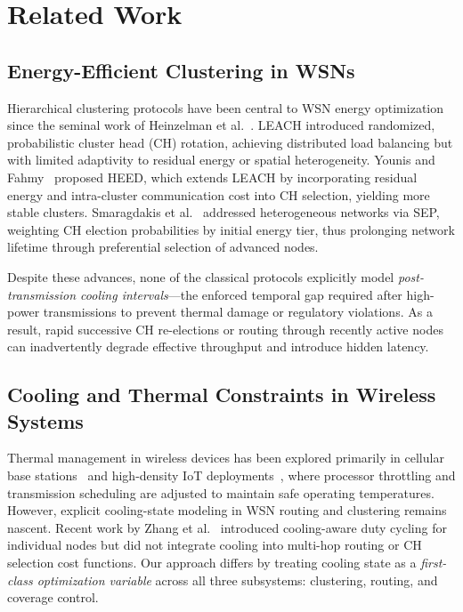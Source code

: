 \section{Related Work}

\subsection{Energy-Efficient Clustering in WSNs}
Hierarchical clustering protocols have been central to WSN energy optimization since the seminal work of Heinzelman et al.~\cite{heinzelman2000leach}. LEACH introduced randomized, probabilistic cluster head (CH) rotation, achieving distributed load balancing but with limited adaptivity to residual energy or spatial heterogeneity. Younis and Fahmy~\cite{younis2004heed} proposed HEED, which extends LEACH by incorporating residual energy and intra-cluster communication cost into CH selection, yielding more stable clusters. Smaragdakis et al.~\cite{smaragdakis2004sep} addressed heterogeneous networks via SEP, weighting CH election probabilities by initial energy tier, thus prolonging network lifetime through preferential selection of advanced nodes.

Despite these advances, none of the classical protocols explicitly model \emph{post-transmission cooling intervals}—the enforced temporal gap required after high-power transmissions to prevent thermal damage or regulatory violations. As a result, rapid successive CH re-elections or routing through recently active nodes can inadvertently degrade effective throughput and introduce hidden latency.

\subsection{Cooling and Thermal Constraints in Wireless Systems}
Thermal management in wireless devices has been explored primarily in cellular base stations~\cite{thermal_cellular2018} and high-density IoT deployments~\cite{iot_thermal2020}, where processor throttling and transmission scheduling are adjusted to maintain safe operating temperatures. However, explicit cooling-state modeling in WSN routing and clustering remains nascent. Recent work by Zhang et al.~\cite{zhang_cooling2021} introduced cooling-aware duty cycling for individual nodes but did not integrate cooling into multi-hop routing or CH selection cost functions. Our approach differs by treating cooling state as a \emph{first-class optimization variable} across all three subsystems: clustering, routing, and coverage control.

